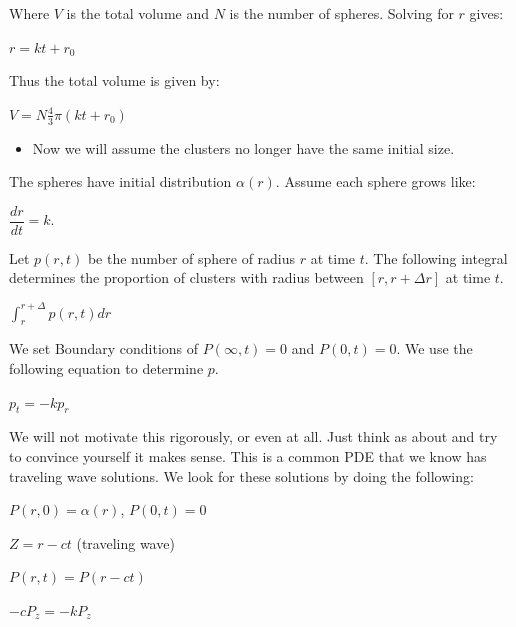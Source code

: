 \documentclass[]{article}
\numberwithin{equation}{section}		%
\begin{document}
Where $V$ is the total volume and $N$ is the number of spheres. Solving for $r$ gives:


\begin{center}
$r = kt+r_{0}$
\end{center}

Thus the total volume is given by:

\begin{center}
$V = N\frac{4}{3}\pi(kt+r_{0})$ 
\end{center}

\begin{itemize}
\item Now we will assume the clusters no longer have the same initial size.
\end{itemize}

The spheres have initial distribution $\alpha(r)$. Assume each sphere grows like:
\begin{center}
 $\dfrac{dr}{dt}=k$.
 \end{center}

Let $p(r,t)$ be the number of sphere of radius $r$ at time $t$. The following integral determines the proportion of clusters with radius between $[r,r + \Delta r]$ at time $t$.
\begin{center}
$\int_{r}^{r+\Delta}p (r,t )dr$
\end{center}




We set Boundary conditions of $P(\infty, t )=0$ and $P (0,t )=0$. We use the following equation to determine $p$.

\begin{center}
$p_{t} = -kp_{r}$
\end{center} 

We will not motivate this rigorously, or even at all. Just think as about and try to convince yourself it makes sense. This is a common PDE that we know has traveling wave solutions. We look for these solutions by doing the following:

\begin{center}
$P (r,0 )=\alpha (r )$, $P (0,t )= 0$
\end{center}
\begin{center}
$Z = r - ct$  (traveling wave)
\end{center}
\begin{center}
$P (r,t )= P (r-ct )$
\end{center}
\begin{center}
$-cP_{z}=-kP_{z}$
\end{center}
\end{document}
